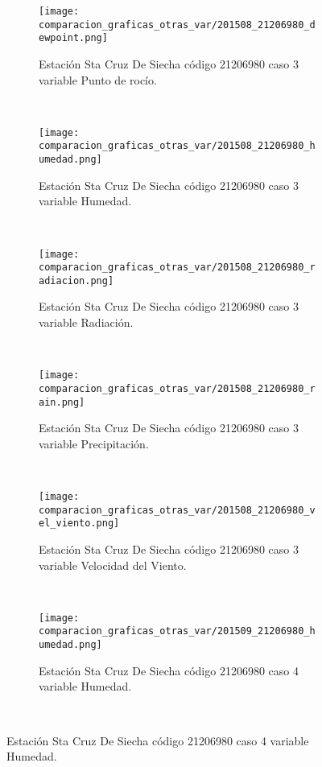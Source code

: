 \begin{figure}[H]
\centering
\begin{subfigure}[normla]{0.4\textwidth}
\caption{Estación Sta Cruz De Siecha código 21206980 caso 3 variable Punto de rocío.}
\texttt{[image: comparacion\_graficas\_otras\_var/201508\_21206980\_dewpoint.png]}
\end{subfigure}
~
\begin{subfigure}[normla]{0.4\textwidth}
\caption{Estación Sta Cruz De Siecha código 21206980 caso 3 variable Humedad.}
\texttt{[image: comparacion\_graficas\_otras\_var/201508\_21206980\_humedad.png]}
\end{subfigure}
~
\begin{subfigure}[normla]{0.4\textwidth}
\caption{Estación Sta Cruz De Siecha código 21206980 caso 3 variable Radiación.}
\texttt{[image: comparacion\_graficas\_otras\_var/201508\_21206980\_radiacion.png]}
\end{subfigure}
~
\begin{subfigure}[normla]{0.4\textwidth}
\caption{Estación Sta Cruz De Siecha código 21206980 caso 3 variable Precipitación.}
\texttt{[image: comparacion\_graficas\_otras\_var/201508\_21206980\_rain.png]}
\end{subfigure}
~
\begin{subfigure}[normla]{0.4\textwidth}
\caption{Estación Sta Cruz De Siecha código 21206980 caso 3 variable Velocidad del Viento.}
\texttt{[image: comparacion\_graficas\_otras\_var/201508\_21206980\_vel\_viento.png]}
\end{subfigure}
~
\begin{subfigure}[normla]{0.4\textwidth}
\caption{Estación Sta Cruz De Siecha código 21206980 caso 4 variable Humedad.}
\texttt{[image: comparacion\_graficas\_otras\_var/201509\_21206980\_humedad.png]}
\end{subfigure}
~
\end{figure}
           

